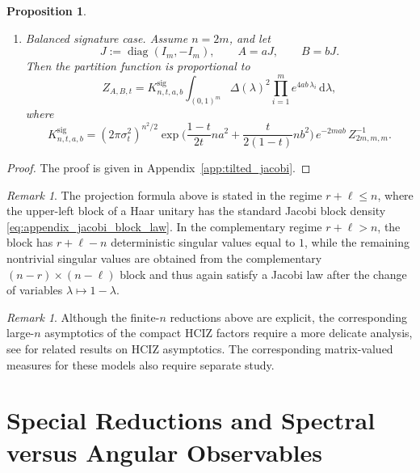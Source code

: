 \documentclass[11pt,a4paper]{article}
\newtheorem{proposition}[theorem]{Proposition}
\theoremstyle{definition}\newtheorem{definition}[theorem]{Definition}
\theoremstyle{remark}\newtheorem{remark}[theorem]{Remark}
\numberwithin{equation}{section}
\DeclareMathOperator{\diag}{diag}
\newcommand{\dd}{\mathrm{d}}
\begin{document}
\begin{proposition}
\begin{enumerate}
\item[\textup{(ii)}] \textup{Balanced signature case.}
Assume $n=2m$, and let
\begin{equation}
J:=\diag(I_m,-I_m),\qquad A=aJ,\qquad B=bJ.
\end{equation}
Then the partition function is proportional to
\begin{equation}\label{eq:sig_direct_jacobi}
Z_{A,B,t}
=
K^{\mathrm{sig}}_{n,t,a,b}
\int_{(0,1)^m}
\Delta(\lambda)^2
\prod_{i=1}^{m} e^{4ab\,\lambda_i}\,\dd \lambda,
\end{equation}
where
\begin{equation}\label{eq:sig_direct_jacobi_const}
K^{\mathrm{sig}}_{n,t,a,b}
=
(2\pi\sigma_t^2)^{n^2/2}
\exp\!\Big(\frac{1-t}{2t}na^2+\frac{t}{2(1-t)}nb^2\Big)\,
e^{-2mab}\,
Z_{2m,m,m}^{-1}.
\end{equation}
\end{enumerate}
\end{proposition}

\begin{proof}
The proof is given in Appendix~\ref{app:tilted_jacobi}.
\end{proof}

\begin{remark}
The projection formula above is stated in the regime $r+\ell\le n$, where the upper-left block of a Haar unitary has the standard Jacobi block density \eqref{eq:appendix_jacobi_block_law}. In the complementary regime $r+\ell>n$, the block has $r+\ell-n$ deterministic singular values equal to $1$, while the remaining nontrivial singular values are obtained from the complementary $(n-r)\times (n-\ell)$ block and thus again satisfy a Jacobi law after the change of variables $\lambda\mapsto 1-\lambda$. 
\end{remark}

\begin{remark}
Although the finite-$n$ reductions above are explicit, the corresponding
large-$n$ asymptotics of the compact HCIZ factors require a more delicate
analysis, see \cite{GuionnetMaida2005} for related results on HCIZ asymptotics. The corresponding
matrix-valued measures for these models also require separate study.
\end{remark}

\section{Special Reductions and Spectral versus Angular Observables}
\label{sec:reductions}
\end{document}

